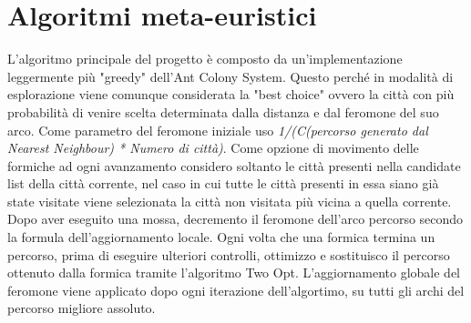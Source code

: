 \section*{Algoritmi meta-euristici}
\label{sec_metaeuristici}
L'algoritmo principale del progetto è composto da un'implementazione leggermente più "greedy" dell'Ant 
Colony System. \newline
Questo perché in modalità di esplorazione viene comunque considerata la "best choice" ovvero la città
con più probabilità di venire scelta determinata dalla distanza e dal feromone del suo arco.\newline
Come parametro del feromone iniziale uso \textit{1/(C(percorso generato dal Nearest Neighbour) * Numero di città)}.\newline
Come opzione di movimento delle formiche ad ogni avanzamento considero soltanto le città presenti nella candidate list
della città corrente, nel caso in cui tutte le città presenti in essa siano già state
visitate viene selezionata la città non visitata più vicina a quella corrente. \newline
Dopo aver eseguito una mossa, decremento il feromone dell'arco percorso secondo la formula dell'aggiornamento locale.\newline
Ogni volta che una formica termina un percorso, prima di eseguire ulteriori controlli, ottimizzo e sostituisco
il percorso ottenuto dalla formica tramite l'algoritmo Two Opt. \newline
L'aggiornamento globale del feromone viene applicato dopo ogni iterazione dell'algortimo, su tutti gli archi del percorso migliore assoluto.

